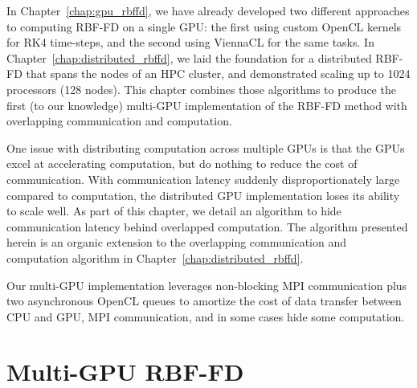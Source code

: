 In Chapter~\ref{chap:gpu_rbffd}, we have already developed two different approaches to computing RBF-FD on a single GPU: the first using custom OpenCL kernels for RK4 time-steps, and the second using ViennaCL for the same tasks. In Chapter~\ref{chap:distributed_rbffd}, we laid the foundation for a distributed RBF-FD that spans the nodes of an HPC cluster, and demonstrated scaling up to 1024 processors (128 nodes). This chapter combines those algorithms to produce the first (to our knowledge) multi-GPU implementation of the RBF-FD method with overlapping communication and computation. 

One issue with distributing computation across multiple GPUs is that the GPUs excel at accelerating computation, but do nothing to reduce the cost of communication. With communication latency suddenly disproportionately large compared to computation, the distributed GPU implementation loses its ability to scale well. As part of this chapter, we detail an algorithm to hide communication latency behind overlapped computation. The algorithm presented herein is an organic extension to the overlapping communication and computation algorithm in Chapter~\ref{chap:distributed_rbffd}. 

Our multi-GPU implementation leverages non-blocking MPI communication plus two asynchronous OpenCL queues to amortize the cost of data transfer between CPU and GPU, MPI communication, and in some cases hide some computation. 

%



\section{Multi-GPU RBF-FD}

